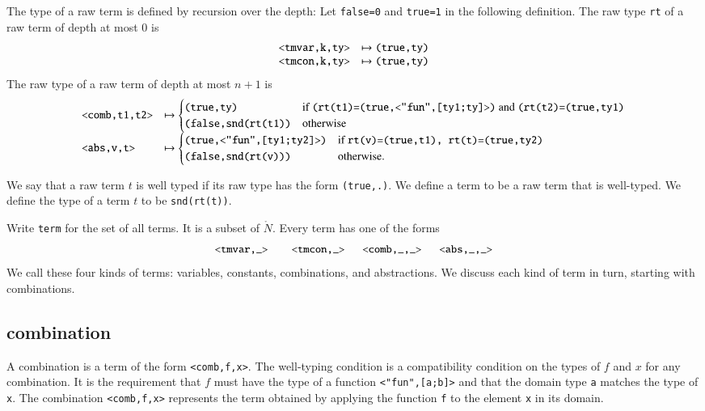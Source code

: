 \begin{definition} The type of a raw term is defined by recursion over the depth: Let \verb!false=0! and \verb!true=1! in
the following definition.
The raw type \verb!rt! of a raw term of depth at most $0$ is
$$
\begin{array}{lll}
\verb!<tmvar,k,ty>!&\mapsto \verb!(true,ty)!\\
\verb!<tmcon,k,ty>!&\mapsto \verb!(true,ty)!
\end{array}
$$
The raw type of a raw term of depth at most $n+1$ is
$$
\begin{array}{lll}
\verb!<comb,t1,t2>!&\mapsto 
\begin{cases}
\verb!(true,ty)! &\hbox{if } \verb!(rt(t1)=(true,<"fun",[ty1;ty]>)! \hbox{ and } \verb!(rt(t2)=(true,ty1)!\\
\verb!(false,snd(rt(t1))! & \hbox{otherwise}
\end{cases}\\
\verb!<abs,v,t>!&\mapsto
 \begin{cases}
\verb!(true,<"fun",[ty1;ty2]>)!&\hbox{if } \verb!rt(v)=(true,t1), rt(t)=(true,ty2)!\\
\verb!(false,snd(rt(v)))!&\hbox{otherwise}.
\end{cases}
\end{array}
$$
\end{definition}

\begin{definition}
We say that a raw term $t$ is well typed if its raw type has the form \verb!(true,.)!.  We define a term to be a raw term that is well-typed.  We define the type of a term $t$ to be \verb!snd(rt(t))!.
\end{definition}

Write \verb!term! for the set of all terms.  It is a subset of $\ring{N}$.  Every term has one of the forms
$$
\verb!<tmvar,_>    <tmcon,_>   <comb,_,_>   <abs,_,_>!
$$
We call these four kinds of terms: variables, constants,
combinations, and abstractions.  We discuss each kind
of term in turn, starting with combinations.


\subsection{combination}

A combination is a term of the form \verb!<comb,f,x>!.  The well-typing condition is a compatibility condition on the types of $f$ and $x$ for any combination.  It is the requirement that $f$ must have the type of a function
\verb!<"fun",[a;b]>! and that the domain type \verb!a! matches the type of \verb!x!.  The combination \verb!<comb,f,x>! represents the term obtained by applying the function \verb!f! to the element \verb!x! in its domain.

